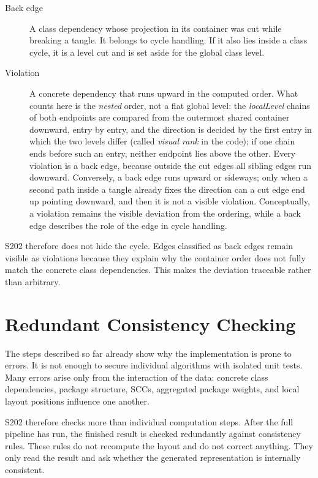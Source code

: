 \documentclass[a4paper,11pt]{article}
\begin{document}
\begin{description}
  \item[Back edge] A class dependency whose projection in its container was cut
        while breaking a tangle. It belongs to cycle handling. If it also lies
        inside a class cycle, it is a level cut and is set aside for the global
        class level.
  \item[Violation] A concrete dependency that runs upward in the computed
        order. What counts here is the \emph{nested} order, not a flat global
        level: the \emph{localLevel} chains of both endpoints are compared from
        the outermost shared container downward, entry by entry, and the
        direction is decided by the first entry in which the two levels differ
        (called \emph{visual rank} in the code); if one chain ends before such
        an entry, neither endpoint lies above the other. Every violation is a back edge, because outside the cut
        edges all sibling edges run downward. Conversely, a back edge runs
        upward or sideways; only when a second path inside a tangle already
        fixes the direction can a cut edge end up pointing downward, and then it
        is not a visible violation. Conceptually, a violation remains the
        visible deviation from the ordering, while a back edge describes the role
        of the edge in cycle handling.
\end{description}

S202 therefore does not hide the cycle. Edges classified as back edges remain
visible as violations because they explain why the container order does not
fully match the concrete class dependencies. This makes the deviation
traceable rather than arbitrary.

\section{Redundant Consistency Checking}

The steps described so far already show why the implementation is prone to
errors. It is not enough to secure individual algorithms with isolated unit
tests. Many errors arise only from the interaction of the data: concrete class
dependencies, package structure, SCCs, aggregated package weights, and local
layout positions influence one another.

S202 therefore checks more than individual computation steps. After the full
pipeline has run, the finished result is checked redundantly against
consistency rules. These rules do not recompute the layout and do not correct
anything. They only read the result and ask whether the generated
representation is internally consistent.
\end{document}
